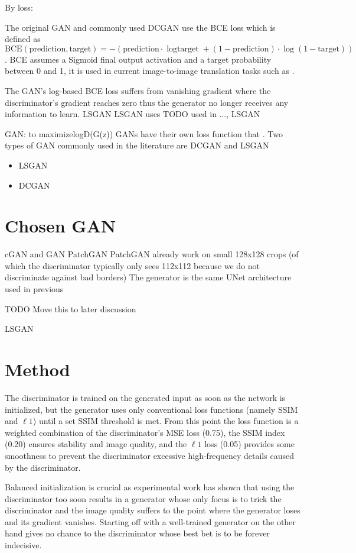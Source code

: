 By loss:

The original \ac{GAN} and commonly used \ac{DCGAN} use the \ac{BCE} loss which is defined as $\text{BCE}(\text{prediction}, \text{target})=-(\text{prediction}\cdot{\log{\text{target}}}+(1-\text{prediction})\cdot \log{(1-\text{target})})$. \ac{BCE} assumes a Sigmoid final output activation and a target probability between 0 and 1, it is used in current image-to-image translation tasks such as \cite{pix2pix}\cite{cyclegan}.

The \ac{GAN}'s log-based \ac{BCE} loss suffers from vanishing gradient where the discriminator's gradient reaches zero thus the generator no longer receives any information to learn. \ac{LSGAN} 
\ac{LSGAN} uses 
 TODO used in ..., \ac{LSGAN} 


GAN: to maximizelogD(G(z))
\acp{GAN} have their own loss function that 
.
Two types of \ac{GAN} commonly used in the literature are \ac{DCGAN} and \ac{LSGAN}
\begin{itemize}
\item \ac{LSGAN}

\item \ac{DCGAN}
\end{itemize}
\section{Chosen GAN}

cGAN and GAN
PatchGAN
PatchGAN  already work on small 128x128 crops (of which the discriminator typically only sees 112x112 because we do not discriminate against bad borders)
The generator is the same UNet architecture used in previous

TODO Move this to later discussion

LSGAN
\section{Method}
The discriminator is trained on the generated input as soon as the network is initialized, but the generator uses only conventional loss functions (namely \ac{SSIM} and $\ell 1$) until a set \ac{SSIM} threshold is met. From this point the loss function is a weighted combination of the discriminator's \ac{MSE} loss (0.75), the \ac{SSIM} index (0.20) ensures stability and image quality, and the $\ell 1$ loss (0.05) provides some smoothness to prevent the discriminator excessive high-frequency details caused by the discriminator. 

Balanced initialization is crucial as experimental work has shown that using the discriminator too soon results in a generator whose only focus is to trick the discriminator and the image quality suffers to the point where the generator loses and its gradient vanishes. Starting off with a well-trained generator on the other hand gives no chance to the discriminator whose best bet is to be forever indecisive.

